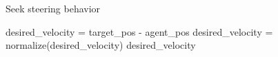 \begin{algorithm}[H]
    \caption{Seek steering behavior}
    \begin{algorithmic}[1]
        \State desired\_velocity = target\_pos - agent\_pos
        \State desired\_velocity = normalize(desired\_velocity)
        \State \Return desired\_velocity
    \end{algorithmic}
    \label{algorithm:seek}
\end{algorithm}

